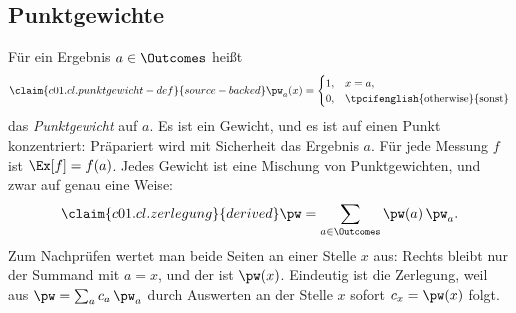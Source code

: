 \subsection{Punktgewichte}\label{c01.s3.1}

Für ein Ergebnis $a \in \Outcomes$ heißt
\begin{equation}\label{c01.eq.punktgewicht}\claim{c01.cl.punktgewicht-def}{source-backed}
  \pw_a(x) =
  \begin{cases}
    1, & x = a, \\
    0, & \text{\tpcifenglish{otherwise}{sonst}}
  \end{cases}
\end{equation}
das \emph{Punktgewicht} auf $a$. Es ist ein Gewicht, und es ist auf einen Punkt
konzentriert: Präpariert wird mit Sicherheit das Ergebnis $a$. Für jede Messung $f$ ist
$\Ex[f] = f(a)$. Jedes Gewicht ist eine Mischung von Punktgewichten, und zwar auf genau
eine Weise:
\begin{equation}\label{c01.eq.zerlegung}\claim{c01.cl.zerlegung}{derived}
  \pw = \sum_{a \in \Outcomes} \pw(a)\, \pw_a .
\end{equation}
Zum Nachprüfen wertet man beide Seiten an einer Stelle $x$ aus: Rechts bleibt nur der
Summand mit $a = x$, und der ist $\pw(x)$. Eindeutig ist die Zerlegung, weil aus
$\pw = \sum_a c_a\, \pw_a$ durch Auswerten an der Stelle $x$ sofort $c_x = \pw(x)$ folgt.

